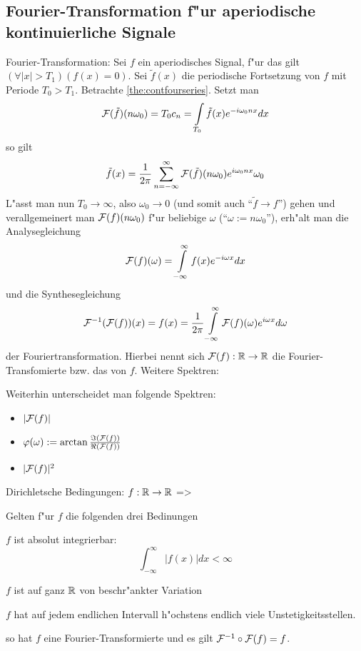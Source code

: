 \subsection{Fourier-Transformation f"ur aperiodische kontinuierliche Signale}
 Fourier-Transformation:{
  Sei $f$ ein aperiodisches Signal, f"ur das gilt 
  $(\forall |x|>T_1)(f(x)=0)$. Sei $\tilde f(x)$ die periodische Fortsetzung
  von $f$ mit Periode $T_0>T_1$.
  Betrachte \ref{the:contfourseries}. Setzt man
  \[
    \FT(\tilde f)(n\omega_0)=T_0 c_n=\int_{T_0} \tilde f(x) e^{-i\omega_0 nx} dx 
  \]
  so gilt
  \[
    \tilde f(x)=\frac 1 {2\pi} \sum_{n=-\infty}^\infty \FT(\tilde f)(n\omega_0) e^{i\omega_0 nx} \omega_0
  \]
  L"asst man nun $T_0\to\infty$, also $\omega_0\to 0$ 
  (und somit auch ``$\tilde f\to f$'') gehen und 
  verallgemeinert man $\mathcal{F}(f)(n\omega_0)$ f"ur beliebige $\omega$ 
  (``$\omega:=n\omega_0$''), erh"alt man die Analysegleichung 
  \[
    \FT(f)(\omega)=\int_{-\infty}^\infty f(x) e^{-i\omega x} dx 
  \]
  und die Synthesegleichung 
  \[
    \FT^{-1}(\FT(f))(x)=f(x)=
      \frac 1 {2\pi} \int_{-\infty}^\infty \FT(f)(\omega) e^{i\omega x} d\omega
  \]
  der Fouriertransformation. Hierbei nennt sich $\mathcal{F}(f):\mathbb R\to\mathbb R$ die 
  Fourier-Transfomierte bzw. das  von $f$.
}
\remark Weitere Spektren:{
  Weiterhin unterscheidet man folgende Spektren:
  \begin{itemize}
    \item {} $|\mathcal{F}(f)|$
    \item {} 
      $\varphi(\omega):=\arctan \frac {\Im(\mathcal{F}(f))}{\Re(\mathcal{F}(f))}$
    \item {} $|\mathcal{F}(f)|^2$
  \end{itemize}
}
\theorem Dirichletsche Bedingungen:
  $f:\mathbb R\to\mathbb R$
  =>
{
  Gelten f"ur $f$ die folgenden drei Bedinungen
  \begin{stmts}
    \item $f$ ist absolut integrierbar:
      \[
        \int_{-\infty}^\infty |f(x)| dx < \infty
      \]
    \item $f$ ist auf ganz $\mathbb R$ von beschr"ankter Variation
    \item $f$ hat auf jedem endlichen Intervall h"ochstens endlich viele
      Unstetigkeitsstellen.
  \end{stmts}
  so hat $f$ eine Fourier-Transformierte und es gilt $\mathcal{F}^{-1}\circ\mathcal{F}(f)=f$.
}
